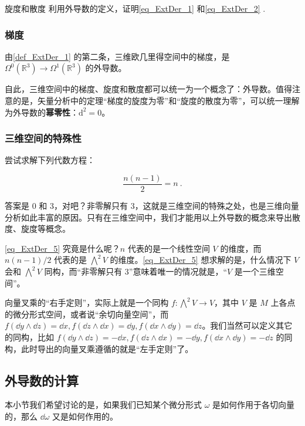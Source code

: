 \begin{exercise}{旋度和散度}
利用外导数的定义，证明\autoref{eq_ExtDer_1} 和\autoref{eq_ExtDer_2} .
\end{exercise}

\subsubsection{梯度}

由\autoref{def_ExtDer_1} 的第二条，三维欧几里得空间中的梯度，是 $\Omega^0(\mathbb{R}^3)\rightarrow\Omega^1(\mathbb{R}^3)$ 的外导数。

自此，三维空间中的梯度、旋度和散度都可以统一为一个概念了：外导数。值得注意的是，矢量分析中的定理“梯度的旋度为零”和“旋度的散度为零”，可以统一理解为外导数的\textbf{幂零性}：$\mathrm{d}^2=0$。

\subsubsection{三维空间的特殊性}

尝试求解下列代数方程：

\begin{equation}\label{eq_ExtDer_5}
\frac{n(n-1)}{2}=n~.
\end{equation}

答案是 $0$ 和 $3$，对吧？非零解只有 $3$，这就是三维空间的特殊之处，也是三维向量分析如此丰富的原因。只有在三维空间中，我们才能用以上外导数的概念来导出散度、旋度等概念。

\autoref{eq_ExtDer_5} 究竟是什么呢？$n$ 代表的是一个线性空间 $V$ 的维度，而 $n(n-1)/2$ 代表的是 $\bigwedge^2 V$ 的维度。\autoref{eq_ExtDer_5} 想求解的是，什么情况下 $V$ 会和 $\bigwedge^2 V$ 同构，而“非零解只有 $3$”意味着唯一的情况就是，“$V$ 是一个三维空间”。

向量叉乘的“右手定则”，实际上就是一个同构 $f:\bigwedge^2 V\to V$，其中 $V$ 是 $M$ 上各点的微分形式空间，或者说“余切向量空间”，而 $f(\dd y\wedge \dd z)=\dd x, f(\dd z\wedge \dd x)=\dd y, f(\dd x\wedge \dd y)=\dd z$。我们当然可以定义其它的同构，比如 $f(\dd y\wedge \dd z)=-\dd x, f(\dd z\wedge \dd x)=-\dd y, f(\dd x\wedge \dd y)=-\dd z$ 的同构，此时导出的向量叉乘遵循的就是“左手定则”了。



\subsection{外导数的计算}

本小节我们希望讨论的是，如果我们已知某个微分形式 $\omega$ 是如何作用于各切向量的，那么 $\dd\omega$ 又是如何作用的。

